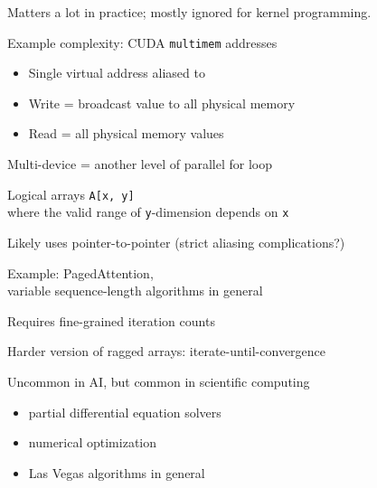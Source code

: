 {\LARGE
Matters a lot in practice; mostly ignored for kernel programming.

\vfill

Example complexity: CUDA \texttt{multimem} addresses

\begin{itemize}
  \item Single virtual address aliased to 
  \item Write = broadcast value to all physical memory
  \item Read =  all physical memory values
\end{itemize}

\vfill

Multi-device = another level of parallel for loop

\vfill

}

\newpage
{}

{\LARGE

Logical arrays \texttt{A[x, y]}\\
where the valid range of \texttt{y}-dimension depends on \texttt{x}

\vfill

Likely uses pointer-to-pointer (strict aliasing complications?)

\vfill

Example: PagedAttention,\\
variable sequence-length algorithms in general

\vfill

Requires fine-grained iteration counts

\vfill

}

\newpage
{}

{\LARGE

Harder version of ragged arrays: iterate-until-convergence

\vfill

Uncommon in AI, but common in scientific computing

\begin{itemize}
  \item partial differential equation solvers
  \item numerical optimization
  \item Las Vegas algorithms in general
\end{itemize}

\vfill

}

